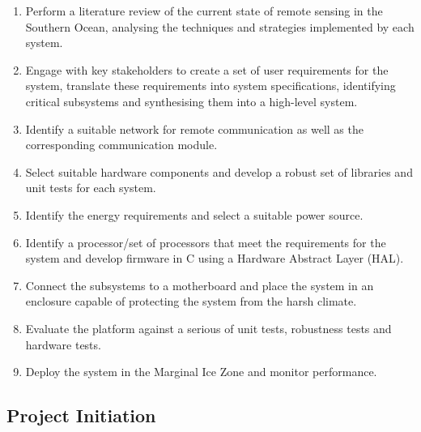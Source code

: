 \begin{enumerate}
    \item Perform a literature review of the current state of remote sensing in the Southern Ocean, analysing the techniques and strategies implemented by each system.
    
    \item Engage with key stakeholders to create a set of user requirements for the system, translate these requirements into system specifications, identifying critical subsystems and synthesising them into a high-level system.
    
    \item Identify a suitable network for remote communication as well as the corresponding communication module.
    
    \item Select suitable hardware components and develop a robust set of libraries and unit tests for each system.
    
    \item Identify the energy requirements and select a suitable power source.
    
    \item Identify a processor/set of processors that meet the requirements for the system and develop firmware in C using a Hardware Abstract Layer (HAL).
    
    \item Connect the subsystems to a motherboard and place the system in an enclosure capable of protecting the system from the harsh climate.
     
    \item Evaluate the platform against a serious of unit tests, robustness tests and  hardware tests.
    
    \item Deploy the system in the Marginal Ice Zone and monitor performance.
\end{enumerate}



\subsection{Project Initiation}

